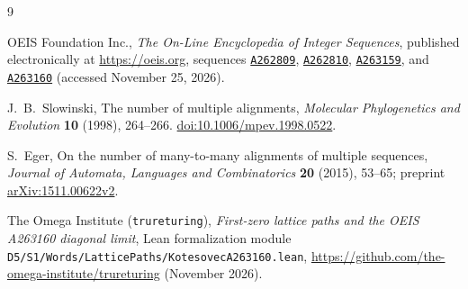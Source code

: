 \documentclass[11pt,a4paper]{article}
\theoremstyle{remark}
\newcommand{\oeis}[1]{\href{https://oeis.org/#1}{\texttt{#1}}}
\begin{document}
\begin{thebibliography}{9}

OEIS Foundation Inc.,
\emph{The On-Line Encyclopedia of Integer Sequences},
published electronically at \url{https://oeis.org},
sequences \oeis{A262809}, \oeis{A262810}, \oeis{A263159}, and \oeis{A263160}
(accessed November 25, 2026).

J.~B.~Slowinski,
The number of multiple alignments,
\emph{Molecular Phylogenetics and Evolution} \textbf{10} (1998), 264--266.
\href{https://doi.org/10.1006/mpev.1998.0522}{doi:10.1006/mpev.1998.0522}.

S.~Eger,
On the number of many-to-many alignments of multiple sequences,
\emph{Journal of Automata, Languages and Combinatorics} \textbf{20} (2015), 53--65;
preprint \href{https://arxiv.org/abs/1511.00622}{arXiv:1511.00622v2}.

The Omega Institute (\texttt{trureturing}),
\emph{First-zero lattice paths and the OEIS A263160 diagonal limit},
Lean formalization module \texttt{D5/S1/Words/LatticePaths/KotesovecA263160.lean},
\url{https://github.com/the-omega-institute/trureturing} (November 2026).

\end{thebibliography}
\end{document}
